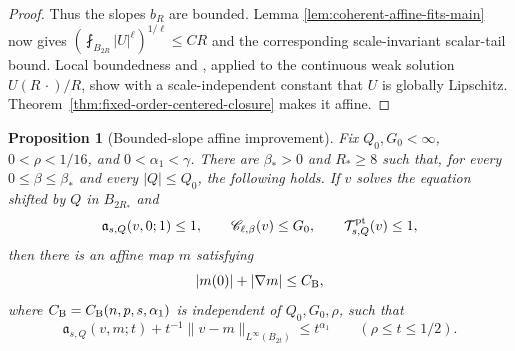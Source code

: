 \documentclass[11pt,reqno]{amsart}
\numberwithin{equation}{section}
\newtheorem{proposition}[theorem]{Proposition}
\theoremstyle{remark}
\begin{document}
\begin{proof}
Thus the slopes \(b_R\) are bounded.  Lemma
\ref{lem:coherent-affine-fits-main} now gives
\((\fint_{B_{2R}}|U|^\ell)^{1/\ell}\le CR\) and the corresponding
scale-invariant scalar-tail bound.  Local boundedness and
\cite[Proposition~1.5 and Theorem~2.1]{BiswasTopp}, applied to the
continuous weak solution \(U(R\,\cdot)/R\), show with a scale-independent
constant that \(U\) is globally Lipschitz.
Theorem~\ref{thm:fixed-order-centered-closure}
makes it affine.
\end{proof}

\begin{proposition}[Bounded-slope affine improvement]
\label{prop:bounded-slope-affine-invariant-block-main}
Fix \(Q_0,G_0<\infty\), \(0<\rho<1/16\), and
\(0<\alpha_1<\gamma\).  There are \(\beta_*>0\) and \(R_*\ge8\) such
that, for every \(0\le\beta\le\beta_*\) and every \(|Q|\le Q_0\), the
following holds.
If \(v\) solves the equation shifted by \(Q\) in \(B_{2R_*}\) and
\begin{equation}
 \mathfrak a_{s,Q}(v,0;1)\le1,
 \qquad\mathscr C_{\ell,\beta}(v)\le G_0,
 \qquad\mathcal T^{\rm pt}_{s,Q}(v)\le1,
 \label{eq:bounded-slope-affine-block-assumptions-main}
\end{equation}
then there is an affine map \(m\) satisfying
\begin{equation*}
 |m(0)|+|\nabla m|\le C_{\rm B},
\end{equation*}
where \(C_{\rm B}=C_{\rm B}(n,p,s,\alpha_1)\) is independent of
\(Q_0,G_0,\rho\), such that
\begin{equation}
\mathfrak a_{s,Q}(v,m;t)
 +t^{-1}\|v-m\|_{L^\infty(B_{2t})}\le t^{\alpha_1}
 \qquad(\rho\le t\le1/2).
 \label{eq:bounded-slope-affine-full-block-main}
\end{equation}
\end{proposition}
\end{document}
